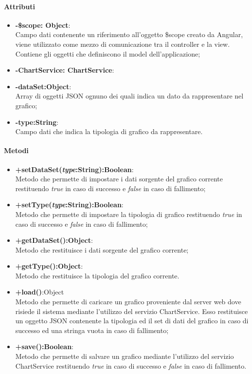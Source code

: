 	\paragraph{Attributi}
	\begin{itemize}
		\item \textbf{-\$scope: Object}:\\
			Campo dati contenente un riferimento all'oggetto \$scope creato da Angular, viene utilizzato come mezzo di comunicazione tra il controller e la view. Contiene gli oggetti che definiscono il model dell'applicazione;
		\item \textbf{-ChartService: ChartService}:\\
			
		\item\textbf{-dataSet:Object}:\\
			Array di oggetti JSON ognuno dei quali indica un dato da rappresentare nel grafico;
		\item\textbf{-type:String}:\\
			Campo dati che indica la tipologia di grafico da rappresentare.
	\end{itemize}
	
	\paragraph{Metodi}
	\begin{itemize}
	\item \textbf{+setDataSet(\textit{type}:String):Boolean}:\\
		Metodo che permette di impostare i dati sorgente del grafico corrente restituendo \textit{true} in caso di successo e \textit{false} in caso di fallimento;
	\item \textbf{+setType(\textit{type}:String):Boolean}:\\
		Metodo che permette di impostare la tipologia di grafico restituendo \textit{true} in caso di successo e \textit{false} in caso di fallimento;
	\item \textbf{+getDataSet():Object}:\\
		Metodo che restituisce i dati sorgente del grafico corrente;
	\item \textbf{+getType():Object}:\\
		Metodo che restituisce la tipologia del grafico corrente.
	\item \textbf{+load()}:Object	\\	
		Metodo che permette di caricare un grafico proveniente dal server web dove risiede il sistema mediante l'utilizzo del servizio ChartService. Esso restituisce un oggetto JSON contenente la tipologia ed il set di dati del grafico in caso di successo ed una stringa vuota in caso di fallimento;
	\item \textbf{+save():Boolean}:\\	
		Metodo che permette di salvare un grafico mediante l'utilizzo del servizio ChartService restituendo \textit{true} in caso di successo e \textit{false} in caso di fallimento.
	
	\end{itemize}
